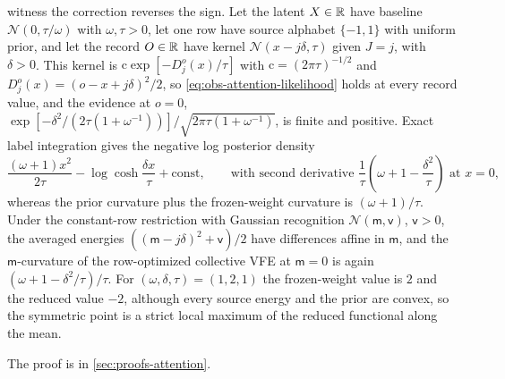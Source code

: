 witness the correction reverses the sign. Let the latent \(X\in\mathbb R\) have
baseline \(\mathcal N(0,\tau/\omega)\) with \(\omega,\tau>0\), let one row have
source alphabet \(\{-1,1\}\) with uniform prior, and let the record \(O\in\mathbb R\)
have kernel \(\mathcal N(x-j\delta,\tau)\) given \(J=j\), with \(\delta>0\).
This kernel is \(\mathrm c\exp[-D_j^o(x)/\tau]\) with
\(\mathrm c=(2\pi\tau)^{-1/2}\) and \(D_j^o(x)=(o-x+j\delta)^2/2\), so
\eqref{eq:obs-attention-likelihood} holds at every record value, and the
evidence at \(o=0\),
\(\exp[-\delta^2/(2\tau(1+\omega^{-1}))]/\sqrt{2\pi\tau(1+\omega^{-1})}\), is
finite and positive. Exact label integration gives the negative log posterior
density
\begin{equation}
\frac{(\omega+1)x^2}{2\tau}-\log\cosh\frac{\delta x}{\tau}+\text{const},
\qquad
\text{with second derivative }\frac1\tau\left(\omega+1-\frac{\delta^2}{\tau}\right)
\text{ at }x=0,
\label{eq:obs-attention-reduced-witness}
\end{equation}
whereas the prior curvature plus the frozen-weight curvature is
\((\omega+1)/\tau\). Under the constant-row restriction with Gaussian
recognition \(\mathcal N(\mathsf m,\mathsf v)\), \(\mathsf v>0\), the averaged
energies \(((\mathsf m-j\delta)^2+\mathsf v)/2\) have differences affine in
\(\mathsf m\), and the \(\mathsf m\)-curvature of the row-optimized collective
VFE at \(\mathsf m=0\) is again \((\omega+1-\delta^2/\tau)/\tau\). For
\((\omega,\delta,\tau)=(1,2,1)\) the frozen-weight value is \(2\) and the
reduced value \(-2\), although every source energy and the prior are convex,
so the symmetric point is a strict local maximum of the reduced functional
along the mean.

The proof is in \cref{sec:proofs-attention}.

